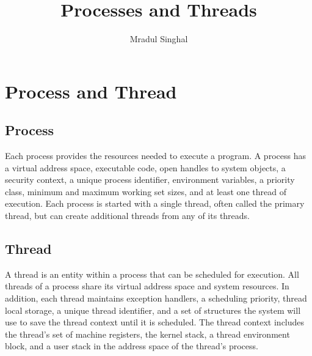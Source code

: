 \documentclass{article}
\title{Processes and Threads}
\author{Mradul Singhal}
\begin{document}
\maketitle
\newpage

\tableofcontents
\newpage

\section{Process and Thread}
\subsection{Process}
Each process provides the resources needed to execute a program. A process has a virtual address space, executable code, open handles to system objects, a security context, a unique process identifier, environment variables, a priority class, minimum and maximum working set sizes, and at least one thread of execution. Each process is started with a single thread, often called the primary thread, but can create additional threads from any of its threads.

\subsection{Thread}
A thread is an entity within a process that can be scheduled for execution. All threads of a process share its virtual address space and system resources. In addition, each thread maintains exception handlers, a scheduling priority, thread local storage, a unique thread identifier, and a set of structures the system will use to save the thread context until it is scheduled. The thread context includes the thread's set of machine registers, the kernel stack, a thread environment block, and a user stack in the address space of the thread's process.
\end{document}
